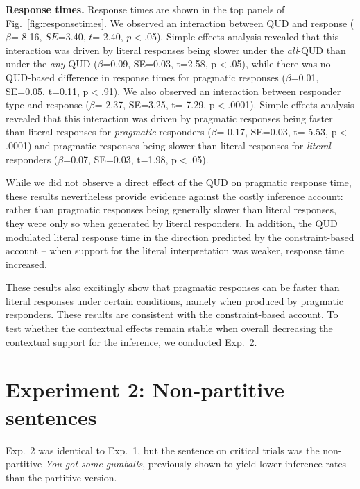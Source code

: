 \documentclass[10pt,letterpaper]{article}
\newcommand{\figref}[1]{Fig.~\ref{#1}}
\begin{document}
  
\noindent \textbf{Response times.} Response times are shown in the top panels of \figref{fig:responsetimes}. We observed an interaction between QUD and response ($\beta$=-8.16, $SE$=3.40, $t$=-2.40, $p$$<$.05). Simple effects analysis revealed that this interaction was driven by literal responses being slower under the \textit{all}-QUD than under the \textit{any}-QUD ($\beta$=0.09, SE=0.03, t=2.58, p$<$.05), while there was no QUD-based difference in response times for pragmatic responses ($\beta$=0.01, SE=0.05, t=0.11, p$<$.91). We also observed an interaction between responder type and response ($\beta$=-2.37, SE=3.25, t=-7.29, p$<$.0001). 
Simple effects analysis revealed that this interaction was driven by pragmatic responses being faster than literal responses for \emph{pragmatic}  responders ($\beta$=-0.17, SE=0.03, t=-5.53, p$<$.0001) and pragmatic responses being slower than literal responses for \emph{literal} responders ($\beta$=0.07, SE=0.03, t=1.98, p$<$.05). 

While we did not observe a direct effect of the QUD on pragmatic response time, these results nevertheless provide evidence against the costly inference account: rather than pragmatic responses being generally slower than literal responses, they were only so when generated by literal responders. In addition, the QUD modulated literal response time in the direction predicted by the constraint-based account -- when support for the literal interpretation was weaker, response time increased.

These results also excitingly show that pragmatic responses can be faster than literal responses under certain conditions, namely when produced by pragmatic responders. These results are consistent with the constraint-based account. To test whether the contextual effects remain stable when overall decreasing the contextual support for the inference, we conducted Exp.~2.


\section{Experiment 2: Non-partitive sentences}

Exp.~2 was identical to Exp.~1, but the sentence on critical trials was the non-partitive \emph{You got some gumballs}, previously shown to yield lower inference rates than the partitive version. %
\end{document}

